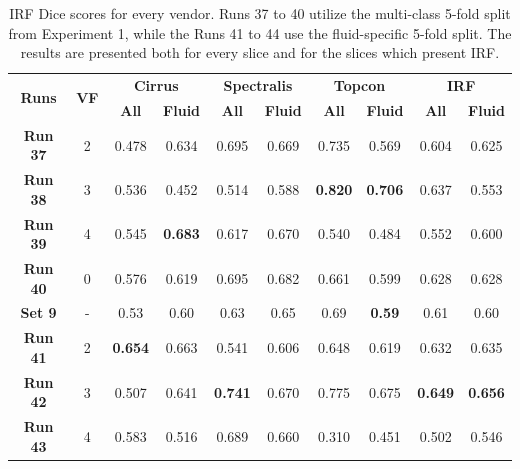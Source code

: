 \begin{table}[!ht]
	\caption{IRF Dice scores for every vendor. Runs 37 to 40 utilize the multi-class 5-fold split from Experiment 1, while the Runs 41 to 44 use the fluid-specific 5-fold split. The results are presented both for every slice and for the slices which present IRF.}
	\centering
	\begin{tabular}{|c|c|cc|cc|cc|cc|}
			\hline
			\multirow{2}{*}{\textbf{Runs}} &
			\multirow{2}{*}{\textbf{VF}} & 
			\multicolumn{2}{c|}{\textbf{Cirrus}} & 
			\multicolumn{2}{c|}{\textbf{Spectralis}} & 
			\multicolumn{2}{c|}{\textbf{Topcon}} & 
			\multicolumn{2}{c|}{\textbf{IRF}} \\ 
			\cline{3-10} & &
			\multicolumn{1}{c}{\textbf{All}} &  
			\textbf{\textbf{Fluid}} & 
			\multicolumn{1}{c}{\textbf{All}} &  
			\textbf{\textbf{Fluid}} & 
			\multicolumn{1}{c}{\textbf{All}} & 
			\textbf{\textbf{Fluid}} & 
			\multicolumn{1}{c}{\textbf{All}} & 
			\textbf{\textbf{Fluid}}\\ 
			
			\hline
			
			\textbf{Run 37} & 2 & 0.478 & 0.634 & 0.695 & 0.669 & 0.735 & 0.569 & 0.604 & 0.625 \\
			
			\textbf{Run 38} & 3 & 0.536 & 0.452 & 0.514 & 0.588 & \textbf{0.820} & \textbf{0.706} & 0.637 & 0.553 \\
			
			\textbf{Run 39} & 4 & 0.545 & \textbf{0.683} & 0.617 & 0.670 & 0.540 & 0.484 & 0.552 & 0.600 \\
			
			\textbf{Run 40} & 0 & 0.576 & 0.619 & 0.695 & 0.682 & 0.661 & 0.599 & 0.628 & 0.628 \\
			
			\hline
			
			\textbf{Set 9} & - & 0.53 & 0.60 & 0.63 & 0.65 & 0.69 & \textbf{0.59} & 0.61 & 0.60 \\
			
			\hline
			\hline
			
			\textbf{Run 41} & 2 & \textbf{0.654} & 0.663 & 0.541 & 0.606 & 0.648 & 0.619 & 0.632 & 0.635 \\
			
			\textbf{Run 42} & 3 & 0.507 & 0.641 & \textbf{0.741} & 0.670 & 0.775 & 0.675 & \textbf{0.649} & \textbf{0.656} \\
			
			\textbf{Run 43} & 4 & 0.583 & 0.516 & 0.689 & 0.660 & 0.310 & 0.451 & 0.502 & 0.546 \\
			

\end{tabular}
\end{table}
